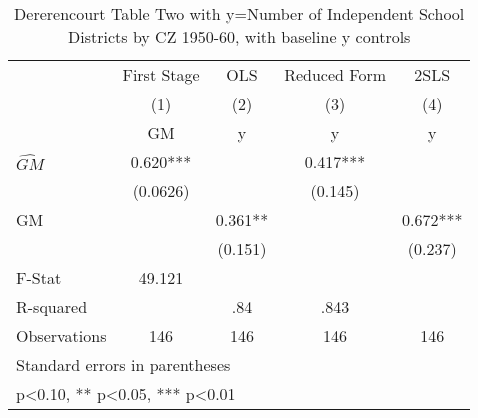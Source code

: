 \begin{table}[htbp]\centering
\def\sym#1{\ifmmode^{#1}\else\(^{#1}\)\fi}
\caption{Dererencourt Table Two with y=Number of Independent School Districts by CZ 1950-60, with baseline y controls}
\begin{tabular}{l*{4}{c}}
\toprule
                    & First Stage   &         OLS   &Reduced Form   &        2SLS   \\
                    &\multicolumn{1}{c}{(1)}&\multicolumn{1}{c}{(2)}&\multicolumn{1}{c}{(3)}&\multicolumn{1}{c}{(4)}\\
                    &\multicolumn{1}{c}{GM}&\multicolumn{1}{c}{y}&\multicolumn{1}{c}{y}&\multicolumn{1}{c}{y}\\
\midrule
$\hat{GM}$          &       0.620***&               &       0.417***&               \\
                    &    (0.0626)   &               &     (0.145)   &               \\
\addlinespace
GM                  &               &       0.361** &               &       0.672***\\
                    &               &     (0.151)   &               &     (0.237)   \\
\midrule
F-Stat              &      49.121   &               &               &               \\
R-squared           &               &         .84   &        .843   &               \\
Observations        &         146   &         146   &         146   &         146   \\
\bottomrule
\multicolumn{5}{l}{\footnotesize Standard errors in parentheses}\\
\multicolumn{5}{l}{\footnotesize * p<0.10, ** p<0.05, *** p<0.01}\\
\end{tabular}
\end{table}
